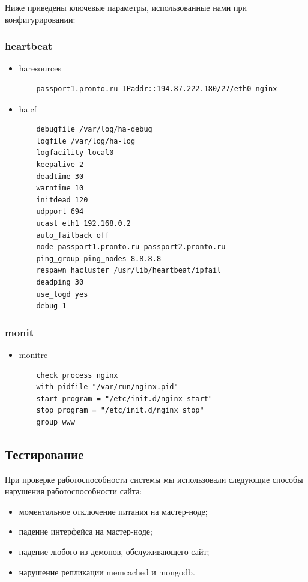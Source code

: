 \documentclass[10pt, a5paper]{article}
\begin{document}
Ниже приведены ключевые параметры, использованные нами при конфигурировании:

\subsubsection*{heartbeat}

\begin{itemize}
  \item haresources
\begin{verbatim}
    passport1.pronto.ru IPaddr::194.87.222.180/27/eth0 nginx
\end{verbatim}
  \item ha.cf
\begin{verbatim}
    debugfile /var/log/ha-debug
    logfile /var/log/ha-log
    logfacility local0
    keepalive 2
    deadtime 30
    warntime 10
    initdead 120
    udpport 694
    ucast eth1 192.168.0.2
    auto_failback off
    node passport1.pronto.ru passport2.pronto.ru
    ping_group ping_nodes 8.8.8.8
    respawn hacluster /usr/lib/heartbeat/ipfail
    deadping 30
    use_logd yes
    debug 1
\end{verbatim}
\end{itemize}
\subsubsection*{monit}

\begin{itemize}
  \item monitrc
\begin{verbatim}
    check process nginx
    with pidfile "/var/run/nginx.pid"
    start program = "/etc/init.d/nginx start"
    stop program = "/etc/init.d/nginx stop"
    group www
\end{verbatim}
\end{itemize}
\subsection*{Тестирование}

При проверке работоспособности системы мы использовали следующие способы нарушения работоспособности сайта:

\begin{itemize}
  \item моментальное отключение питания на мастер-ноде;
  \item падение интерфейса на мастер-ноде;
  \item падение любого из демонов, обслуживающего сайт;
  \item нарушение репликации memcached и mongodb.
\end{itemize}
\end{document}
